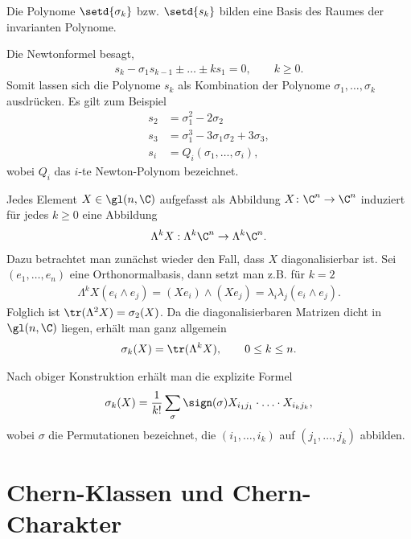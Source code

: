 \documentclass[%
	paper=a5,%
	fleqn,%
	DIV=18,%
	BCOR=0mm,
	fontsize=11pt,
	titlepage=false,%
	bibliography=totoc,
	DIV=18,%
	twoside=true,
	pdftitle=Riemannsche Geometrie,
	pdfauthor=Uwe Semmelmann,
	numbers=noendperiod]%
	{scrbook}
\begin{document}
\begin{rem}[Bemerkungen.]
\begin{remenum}
\item Die Polynome $\setd{\sigma_k}$ bzw. $\setd{s_k}$ bilden eine Basis des
Raumes der invarianten Polynome.
\item Die Newtonformel besagt,
\begin{align*}
s_k - \sigma_1 s_{k-1} \pm \ldots \pm k s_1 = 0,\qquad k\ge 0.
\end{align*}
Somit lassen sich die Polynome $s_k$ als Kombination der Polynome
$\sigma_1,\ldots,\sigma_k$ ausdrücken. Es gilt zum Beispiel
\begin{align*}
s_2 &= \sigma_1^2 - 2\sigma_2\\
s_3 &= \sigma_1^3 - 3\sigma_1\sigma_2 + 3\sigma_3,\\
s_i &= Q_i(\sigma_1,\ldots,\sigma_i),
\end{align*}
wobei $Q_i$ das $i$-te Newton-Polynom bezeichnet.
\item Jedes Element $X\in\gl(n,\C)$ aufgefasst als Abbildung $X\colon \C^n\to \C^n$
induziert für jedes $k\ge 0$ eine Abbildung
\begin{align*}
\Lambda^k X : \Lambda^k \C^n\to \Lambda^k \C^n.
\end{align*}
Dazu betrachtet man zunächst wieder den Fall, dass $X$ diagonalisierbar ist. Sei
$(e_1,\ldots,e_n)$ eine Orthonormalbasis, dann setzt man z.B. für $k=2$
\begin{align*}
\Lambda^kX(e_i\wedge e_j) = (Xe_i) \wedge (Xe_j) = \lambda_i \lambda_j
(e_i\wedge e_j).
\end{align*}
Folglich ist  $\tr(\Lambda^2 X) = \sigma_2(X)$. Da die diagonalisierbaren
Matrizen dicht in $\gl(n,\C)$ liegen, erhält man ganz allgemein
\begin{align*}
\sigma_k(X) = \tr(\Lambda^k X),\qquad 0 \le k \le n.
\end{align*}
\item Nach obiger Konstruktion erhält man die explizite Formel
\begin{align*}
\sigma_k(X) = \frac{1}{k!} \sum_{\sigma} \sign(\sigma) X_{i_1 j_1}\cdot \ldots
\cdot X_{i_k j_k},
\end{align*}
wobei $\sigma$ die Permutationen bezeichnet, die $(i_1,\ldots,i_k)$ auf
$(j_1,\ldots,j_k)$ abbilden.~\map
\end{remenum}
\end{rem}

\section{Chern-Klassen und Chern-Charakter}
\end{document}
